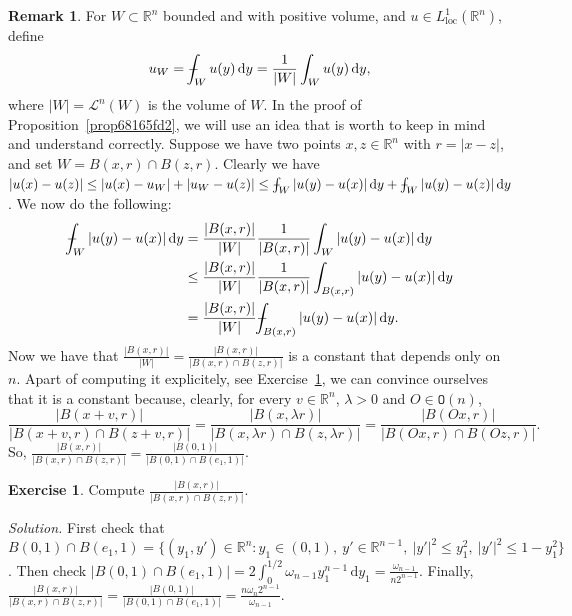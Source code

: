 \documentclass[a4paper,9pt]{amsart}
\newcommand{\scr}[1]{\mathscr{#1}}
\newcommand{\R}{\mathbb{R}}	%
\newcommand{\did}{\,\mathrm{d}}	%
\newcommand{\Orth}{\mathtt{O}} %
\newcommand{\loc}{\mathrm{loc}}
\newcommand{\grad}{\nabla}
\def\Xint#1{\mathchoice
      {\XXint\displaystyle\textstyle{#1}}%
      {\XXint\textstyle\scriptstyle{#1}}%
      {\XXint\scriptstyle\scriptscriptstyle{#1}}%
      {\XXint\scriptscriptstyle\scriptscriptstyle{#1}}%
      \!\int}
\def\XXint#1#2#3{{\setbox0=\hbox{$#1{#2#3}{\int}$}
        \vcenter{\hbox{$#2#3$}}\kern-.5\wd0}}
\def\fint{\Xint-}
\theoremstyle{plain}
\theoremstyle{definition}
\newtheorem{remark}[proposition]{Remark}
\newtheorem{exercise}[proposition]{Exercise}%
\theoremstyle{remark}
\begin{document}
\begin{remark}\label{rem68165c8c}
	For $W\subset\R^n$ bounded and with positive volume, and $u\in L^1_\loc(\R^n)$, define
	\begin{equation}
		u_W = \fint_W u(y)\did y = \frac1{|W|} \int_W u(y) \did y ,
	\end{equation}
	where $|W|=\scr L^n(W)$ is the volume of $W$.
	In the proof of Proposition~\ref{prop68165fd2}, we will use an idea that is worth to keep in mind and understand correctly. 
	Suppose we have two points $x,z\in\R^n$ with $r=|x-z|$, and set $W=B(x,r)\cap B(z,r)$.
	Clearly we have $|u(x)-u(z)|\le |u(x) - u_W| + |u_W - u(z)|\le \fint_W |u(y)-u(x)| \did y + \fint_W |u(y)-u(z)| \did y$.
	We now do the following:
	\begin{align}
		\fint_W |u(y)-u(x)| \did y
		&= \frac{|B(x,r)|}{|W|} \frac{1}{|B(x,r)|} \int_W |u(y)-u(x)| \did y \\
		&\le \frac{|B(x,r)|}{|W|} \frac{1}{|B(x,r)|} \int_{B(x,r)} |u(y)-u(x)| \did y \\
		&= \frac{|B(x,r)|}{|W|} \fint_{B(x,r)} |u(y)-u(x)| \did y .
	\end{align}
	Now we have that $\frac{|B(x,r)|}{|W|} = \frac{|B(x,r)|}{|B(x,r)\cap B(z,r)|}$ is a constant that depends only on $n$.
	Apart of computing it explicitely, see Exercise~\ref{ex681659a2}, we can convince ourselves that it is a constant because, clearly, for every $v\in\R^n$, $\lambda>0$ and $O\in\Orth(n)$,
	\begin{equation}
		 \frac{|B(x+v,r)|}{|B(x+v,r)\cap B(z+v,r)|}
		= \frac{|B(x,\lambda r)|}{|B(x,\lambda r)\cap B(z,\lambda r)|}
		= \frac{|B(Ox,r)|}{|B(Ox,r)\cap B(Oz,r)|} .
	\end{equation}
	So, $\frac{|B(x,r)|}{|B(x,r)\cap B(z,r)|} = \frac{|B(0,1)|}{|B(0,1)\cap B(e_1,1)|}$.
\end{remark}
\begin{exercise}\label{ex681659a2}
	Compute $\frac{|B(x,r)|}{|B(x,r)\cap B(z,r)|}$.

	{\it Solution.}
	First check that 
	$B(0,1)\cap B(e_1,1) = \{(y_1,y')\in\R^n : y_1\in(0,1),\ y'\in\R^{n-1},\ |y'|^2\le y_1^2,\ |y'|^2 \le 1-y_1^2\}$.
	Then check $|B(0,1)\cap B(e_1,1)| = 2\int_0^{1/2} \omega_{n-1} y_1^{n-1} \did y_1 = \frac{\omega_{n-1}}{n2^{n-1}}$.
	Finally, $\frac{|B(x,r)|}{|B(x,r)\cap B(z,r)|} = \frac{|B(0,1)|}{|B(0,1)\cap B(e_1,1)|} = \frac{n\omega_n2^{n-1}}{\omega_{n-1}}$.
\end{exercise}
\end{document}

